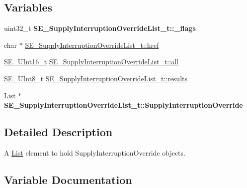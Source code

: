 \subsection*{Variables}
\begin{DoxyCompactItemize}
\item 
\mbox{\label{group__SupplyInterruptionOverrideList_ga9b72b2e68f92763955a6f3a3d5ebd718}} 
uint32\+\_\+t {\bfseries S\+E\+\_\+\+Supply\+Interruption\+Override\+List\+\_\+t\+::\+\_\+flags}
\item 
char $\ast$ \hyperlink{group__SupplyInterruptionOverrideList_gad15eb8acad90ef62beb20d8dff40fc29}{S\+E\+\_\+\+Supply\+Interruption\+Override\+List\+\_\+t\+::href}
\item 
\hyperlink{group__UInt16_gac68d541f189538bfd30cfaa712d20d29}{S\+E\+\_\+\+U\+Int16\+\_\+t} \hyperlink{group__SupplyInterruptionOverrideList_ga7b7aae197507ee1243fb86a95a7da717}{S\+E\+\_\+\+Supply\+Interruption\+Override\+List\+\_\+t\+::all}
\item 
\hyperlink{group__UInt8_gaf7c365a1acfe204e3a67c16ed44572f5}{S\+E\+\_\+\+U\+Int8\+\_\+t} \hyperlink{group__SupplyInterruptionOverrideList_gad45b841730b071b050986cae31535380}{S\+E\+\_\+\+Supply\+Interruption\+Override\+List\+\_\+t\+::results}
\item 
\mbox{\label{group__SupplyInterruptionOverrideList_ga3569a2d9c44ec4e8ea8a56794d2ae26b}} 
\hyperlink{structList}{List} $\ast$ {\bfseries S\+E\+\_\+\+Supply\+Interruption\+Override\+List\+\_\+t\+::\+Supply\+Interruption\+Override}
\end{DoxyCompactItemize}


\subsection{Detailed Description}
A \hyperlink{structList}{List} element to hold Supply\+Interruption\+Override objects. 

\subsection{Variable Documentation}
\mbox{\label{group__SupplyInterruptionOverrideList_ga7b7aae197507ee1243fb86a95a7da717}} 
